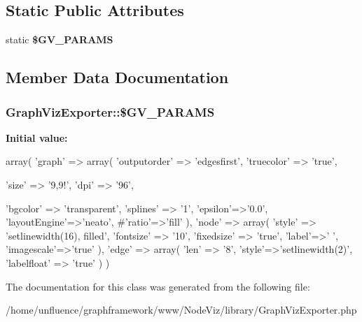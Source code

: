 \subsection*{Static Public Attributes}
\begin{DoxyCompactItemize}
\item 
static {\bfseries \$GV\_\-PARAMS}
\end{DoxyCompactItemize}


\subsection{Member Data Documentation}
\hypertarget{classGraphVizExporter_a227940f38a3a387e9225d563e1170578}{
\subsubsection[{\$GV\_\-PARAMS}]{\setlength{\rightskip}{0pt plus 5cm}GraphVizExporter::\$GV\_\-PARAMS}}
\label{classGraphVizExporter_a227940f38a3a387e9225d563e1170578}
{\bfseries Initial value:}
\begin{DoxyCode}
 array(
        'graph' => array(
            'outputorder' => 'edgesfirst',
            'truecolor' => 'true',
            
            'size' => '9,9!',
            'dpi' => '96',
            
            'bgcolor' => 'transparent',
            'splines' => '1',
            'epsilon'=>'0.0',
            'layoutEngine'=>'neato',
            #'ratio'=>'fill'
        ),
        'node' => array(
            'style' => 'setlinewidth(16), filled',
            'fontsize' => '10',
            'fixedsize' => 'true', 
            'label'=>' ',
            'imagescale'=>'true'
        ),
        'edge' => array(
            'len' => '8',
            'style'=>'setlinewidth(2)',
            'labelfloat' => 'true'
        )
    )
\end{DoxyCode}


The documentation for this class was generated from the following file:\begin{DoxyCompactItemize}
\item 
/home/unfluence/graphframework/www/NodeViz/library/GraphVizExporter.php\end{DoxyCompactItemize}
